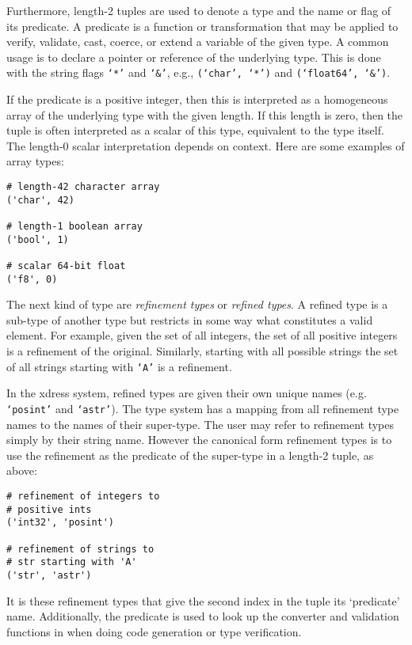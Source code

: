 \documentclass{ansconfpaper}
\newcommand{\vin}[1]{\texttt{{#1}}}
\begin{document}
Furthermore, length-2 tuples are used to denote a type and the name or flag of its
predicate.  A predicate is a function or transformation that may be applied to 
verify, validate, cast, coerce, or extend a variable of the given type.  A common 
usage is to declare a pointer or reference of the underlying type.  This is done with 
the string flags \vin{`*'} and \vin{`\&'}, e.g.,  \vin{(`char', `*')} and 
\vin{(`float64', `\&')}.

If the predicate is a positive integer, then this is interpreted as a 
homogeneous array of the underlying type with the given length.  If this length 
is zero, then the tuple is often interpreted as a scalar of this type, equivalent 
to the type itself.  The length-0 scalar interpretation depends on context.  Here 
are some examples of array types:
\begin{lstlisting}
# length-42 character array
('char', 42)  

# length-1 boolean array
('bool', 1)   

# scalar 64-bit float
('f8', 0)     
\end{lstlisting}

The next kind of type are \emph{refinement types} or \emph{refined types}.  
A refined type
is a sub-type of another type but restricts in some way what constitutes a valid 
element.  For example, given the set of all integers, the set of all positive 
integers is a refinement of the original.  Similarly, starting with all possible
strings the set of all strings starting with \vin{`A'} is a refinement.

In the xdress system, refined types are given their own unique names (e.g. 
\vin{`posint'} and \vin{`astr'}).  The type system has a mapping from all refinement
type names to the names of their super-type.  The user may refer to refinement types
simply by their string name.  However the canonical form refinement types is to use
the refinement as the predicate of the super-type in a length-2 tuple, as above:
\begin{lstlisting}
# refinement of integers to 
# positive ints
('int32', 'posint')

# refinement of strings to 
# str starting with 'A'
('str', 'astr')      
\end{lstlisting}
It is these refinement types that give the second index in the tuple its `predicate'
name.  Additionally, the predicate is used to look up the converter and validation
functions in when doing code generation or type verification.
\end{document}
